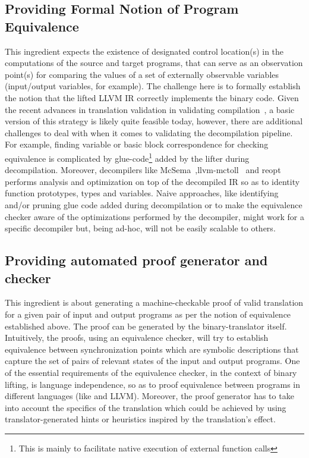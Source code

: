 \subsection{Providing Formal Notion of Program Equivalence} This ingredient
expects the existence of designated control location(s) in the computations of
the source and target programs, that can serve as an observation point(s) for
comparing the values of a set of externally observable variables (input/output
    variables, for example). The challenge here is to formally establish the
notion that the lifted LLVM IR  correctly implements the \ISA binary code.
Given the recent advances in translation validation in validating
compilation~\cite{VOC2002,TVOC:CAV2005,Necula:2000,Sewell:2013,Kundu:2009,Kedar:SAS2013,DDEC:OOPSLA:2013,Tate:2009,Tristan:2011},
  a basic version of this strategy is likely quite feasible today, however,
  there are additional challenges to deal with when it comes to validating the
  decompilation pipeline. For example, finding variable or  basic block
  correspondence for checking equivalence is complicated by
  glue-code\footnote{This is mainly to facilitate native execution of external
    function calls} added by the lifter during decompilation. Moreover,
    decompilers like
    McSema~\cite{McSema:Recon14},llvm-mctoll~\cite{llvm-mctoll} and
    reopt~\cite{reopt} performs analysis and optimization on top of the
    decompiled IR so as to identity function prototypes, types and variables.
    Naive approaches, like identifying and/or pruning glue code added during
    decompilation or to make the equivalence checker aware of the optimizations
    performed by the decompiler, might work for a specific decompiler but,
    being ad-hoc, will not be easily scalable to others.  
      

\subsection{Providing automated proof generator and checker} This ingredient is
about generating a machine-checkable proof  of valid translation for a given
pair of input and output programs as per the notion of equivalence established
above. The proof can be generated by  the binary-translator itself.
Intuitively, the proofs, using an equivalence checker,  will try to establish
equivalence between synchronization points which are symbolic descriptions that
capture the set of pairs of relevant states of the input and output programs.
One of the essential requirements of the equivalence checker,  in the context
of binary lifting, is language independence, so as  to proof equivalence
between programs in different languages (like \ISA and LLVM). Moreover, the
proof generator has to take into account the specifics of the translation which
could be achieved by using translator-generated hints or heuristics inspired by
the translation's effect. 

